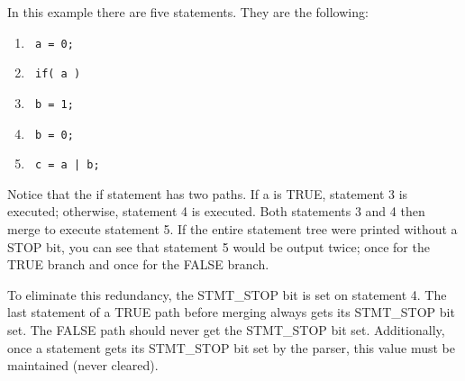 \begin{Desc}
\item[]In this example there are five statements. They are the following:\end{Desc}
\begin{Desc}
\item[]\begin{enumerate}
\item 

\footnotesize\begin{verbatim} a = 0; 
\end{verbatim}\normalsize
\item 

\footnotesize\begin{verbatim} if( a ) 
\end{verbatim}\normalsize
\item 

\footnotesize\begin{verbatim} b = 1; 
\end{verbatim}\normalsize
\item 

\footnotesize\begin{verbatim} b = 0; 
\end{verbatim}\normalsize
\item 

\footnotesize\begin{verbatim} c = a | b; 
\end{verbatim}\normalsize
\end{enumerate}
\end{Desc}
\begin{Desc}
\item[]Notice that the if statement has two paths. If a is TRUE, statement 3 is executed; otherwise, statement 4 is executed. Both statements 3 and 4 then merge to execute statement 5. If the entire statement tree were printed without a STOP bit, you can see that statement 5 would be output twice; once for the TRUE branch and once for the FALSE branch.\end{Desc}
\begin{Desc}
\item[]To eliminate this redundancy, the STMT\_\-STOP bit is set on statement 4. The last statement of a TRUE path before merging always gets its STMT\_\-STOP bit set. The FALSE path should never get the STMT\_\-STOP bit set. Additionally, once a statement gets its STMT\_\-STOP bit set by the parser, this value must be maintained (never cleared).\end{Desc}
